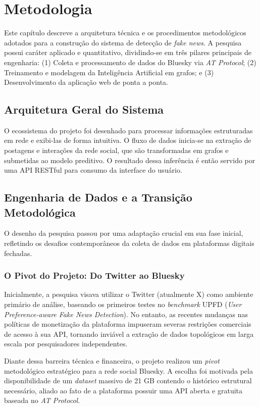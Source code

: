 \chapter{Metodologia}

Este capítulo descreve a arquitetura técnica e os procedimentos metodológicos adotados para a construção do sistema de detecção de \textit{fake news}. A pesquisa possui caráter aplicado e quantitativo, dividindo-se em três pilares principais de engenharia: (1) Coleta e processamento de dados do Bluesky via \textit{AT Protocol}; (2) Treinamento e modelagem da Inteligência Artificial em grafos; e (3) Desenvolvimento da aplicação web de ponta a ponta.

\section{Arquitetura Geral do Sistema}

O ecossistema do projeto foi desenhado para processar informações estruturadas em rede e exibi-las de forma intuitiva. O fluxo de dados inicia-se na extração de postagens e interações da rede social, que são transformadas em grafos e submetidas ao modelo preditivo. O resultado dessa inferência é então servido por uma API RESTful para consumo da interface do usuário.

\section{Engenharia de Dados e a Transição Metodológica}

O desenho da pesquisa passou por uma adaptação crucial em sua fase inicial, refletindo os desafios contemporâneos da coleta de dados em plataformas digitais fechadas.

\subsection{O Pivot do Projeto: Do Twitter ao Bluesky}

Inicialmente, a pesquisa visava utilizar o Twitter (atualmente X) como ambiente primário de análise, baseando os primeiros testes no \textit{benchmark} UPFD (\textit{User Preference-aware Fake News Detection}). No entanto, as recentes mudanças nas políticas de monetização da plataforma impuseram severas restrições comerciais de acesso à sua API, tornando inviável a extração de dados topológicos em larga escala por pesquisadores independentes.

Diante dessa barreira técnica e financeira, o projeto realizou um \textit{pivot} metodológico estratégico para a rede social Bluesky. A escolha foi motivada pela disponibilidade de um \textit{dataset} massivo de 21 GB contendo o histórico estrutural necessário, aliado ao fato de a plataforma possuir uma API aberta e gratuita baseada no \textit{AT Protocol}.

